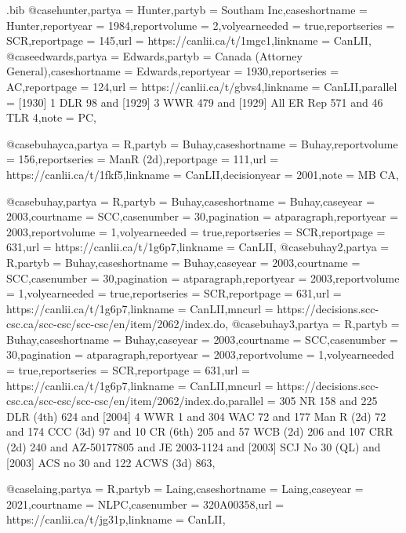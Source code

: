 \begin{filecontents*}[overwrite]{\jobname.bib}
@case{hunter,partya =  {Hunter},partyb =  {Southam Inc},caseshortname =  {Hunter},reportyear =  {1984},reportvolume =  {2},volyearneeded =  {true},reportseries =  {SCR},reportpage =  {145},url =  {https://canlii.ca/t/1mgc1},linkname =  {CanLII},}
@case{edwards,partya =  {Edwards},partyb =  {Canada (Attorney General)},caseshortname =  {Edwards},reportyear =  {1930},reportseries =  {AC},reportpage =  {124},url =  {https://canlii.ca/t/gbvs4},linkname =  {CanLII},parallel =  { [1930] 1 DLR 98 and [1929] 3 WWR 479 and [1929] All ER Rep 571 and 46 TLR 4},note =  {PC},}

@case{buhayca,partya =  {R},partyb =  {Buhay},caseshortname =  {Buhay},reportvolume =  {156},reportseries =  {ManR (2d)},reportpage =  {111},url =  {https://canlii.ca/t/1fkf5},linkname =  {CanLII},decisionyear =  {2001},note =  {MB CA},}

@case{buhay,partya =  {R},partyb =  {Buhay},caseshortname =  {Buhay},caseyear =  {2003},courtname =  {SCC},casenumber =  {30},pagination =  {atparagraph},reportyear =  {2003},reportvolume =  {1},volyearneeded =  {true},reportseries =  {SCR},reportpage =  {631},url =  {https://canlii.ca/t/1g6p7},linkname =  {CanLII},}
@case{buhay2,partya =  {R},partyb =  {Buhay},caseshortname =  {Buhay},caseyear =  {2003},courtname =  {SCC},casenumber =  {30},pagination =  {atparagraph},reportyear =  {2003},reportvolume =  {1},volyearneeded =  {true},reportseries =  {SCR},reportpage =  {631},url =  {https://canlii.ca/t/1g6p7},linkname =  {CanLII},mncurl =  {https://decisions.scc-csc.ca/scc-csc/scc-csc/en/item/2062/index.do},}
@case{buhay3,partya =  {R},partyb =  {Buhay},caseshortname =  {Buhay},caseyear =  {2003},courtname =  {SCC},casenumber =  {30},pagination =  {atparagraph},reportyear =  {2003},reportvolume =  {1},volyearneeded =  {true},reportseries =  {SCR},reportpage =  {631},url =  {https://canlii.ca/t/1g6p7},linkname =  {CanLII},mncurl =  {https://decisions.scc-csc.ca/scc-csc/scc-csc/en/item/2062/index.do},parallel =  {305 NR 158 and 225 DLR (4th) 624 and [2004] 4 WWR 1 and 304 WAC 72 and 177 Man R (2d) 72 and 174 CCC (3d) 97 and 10 CR (6th) 205 and 57 WCB (2d) 206 and 107 CRR (2d) 240 and AZ-50177805 and JE 2003-1124 and [2003] SCJ No 30 (QL) and [2003] ACS no 30 and 122 ACWS (3d) 863},}


@case{laing,partya =  {R},partyb =  {Laing},caseshortname =  {Laing},caseyear =  {2021},courtname =  {NLPC},casenumber =  {320A00358},url =  {https://canlii.ca/t/jg31p},linkname =  {CanLII},}




\end{filecontents*}
